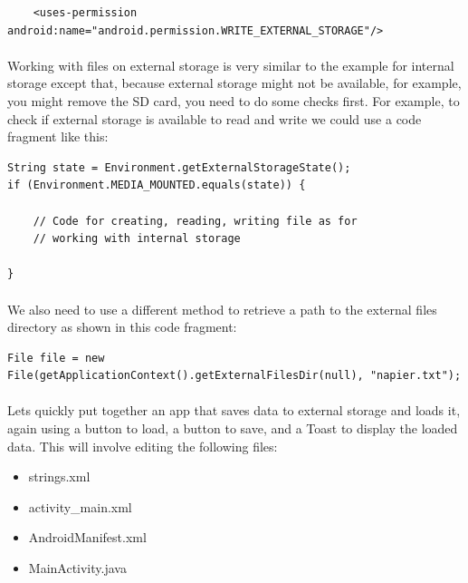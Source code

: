 \begin{lstlisting}
    <uses-permission android:name="android.permission.WRITE_EXTERNAL_STORAGE"/>
\end{lstlisting}

\paragraph{} Working with files on external storage is very similar to the example for internal storage except that, because external storage might not be available, for example, you might remove the SD card, you need to do some checks first. For example, to check if external storage is available to read and write we could use a code fragment like this:

\begin{lstlisting}
String state = Environment.getExternalStorageState();
if (Environment.MEDIA_MOUNTED.equals(state)) {
    
    // Code for creating, reading, writing file as for
    // working with internal storage

}
\end{lstlisting}

\paragraph{} We also need to use a different method to retrieve a path to the external files directory as shown in this code fragment:

\begin{lstlisting}
File file = new File(getApplicationContext().getExternalFilesDir(null), "napier.txt");
\end{lstlisting}

\paragraph{} Lets quickly put together an app that saves data to external storage and loads it, again using a button to load, a button to save, and a Toast to display the loaded data. This will involve editing the following files:

\begin{itemize}
\item strings.xml
\item activity\_main.xml
\item AndroidManifest.xml
\item MainActivity.java
\end{itemize}

